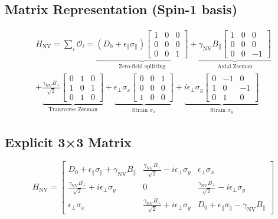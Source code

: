 \subsection*{Matrix Representation (Spin-1 basis)}
\begin{multline*}
H_{\text{NV}} = \sum_{i} \mathcal{O}_i =
\underbrace{(D_0 + \epsilon_{\parallel}\sigma_{\parallel})
\begin{bmatrix}
1 & 0 & 0 \\
0 & 0 & 0 \\
0 & 0 & 1
\end{bmatrix}}_{\text{Zero-field splitting}}
+
\underbrace{\gamma_{\text{NV}} B_{\parallel}
\begin{bmatrix}
1 & 0 & 0 \\
0 & 0 & 0 \\
0 & 0 & -1
\end{bmatrix}}_{\text{Axial Zeeman}} \\
+
\underbrace{\frac{\gamma_{\text{NV}} B_{\perp}}{\sqrt{2}}
\begin{bmatrix}
0 & 1 & 0 \\
1 & 0 & 1 \\
0 & 1 & 0
\end{bmatrix}}_{\text{Transverse Zeeman}}
+
\underbrace{\epsilon_{\perp}\sigma_x
\begin{bmatrix}
0 & 0 & 1 \\
0 & 0 & 0 \\
1 & 0 & 0
\end{bmatrix}}_{\text{Strain } \sigma_x}
+
\underbrace{i\epsilon_{\perp}\sigma_y
\begin{bmatrix}
0 & -1 & 0 \\
1 & 0 & -1 \\
0 & 1 & 0
\end{bmatrix}}_{\text{Strain } \sigma_y}
\end{multline*}
\subsection*{Explicit 3×3 Matrix}


\begin{equation}
H_{\text{NV}} = 
\begin{bmatrix}
D_0 + \epsilon_{\parallel}\sigma_{\parallel} + \gamma_{\text{NV}}B_{\parallel} 
& \frac{\gamma_{\text{NV}} B_{\perp}}{\sqrt{2}} - i\epsilon_{\perp}\sigma_y 
& \epsilon_{\perp}\sigma_x \\
\frac{\gamma_{\text{NV}} B_{\perp}}{\sqrt{2}} + i\epsilon_{\perp}\sigma_y 
& 0 
& \frac{\gamma_{\text{NV}} B_{\perp}}{\sqrt{2}} - i\epsilon_{\perp}\sigma_y \\
\epsilon_{\perp}\sigma_x 
& \frac{\gamma_{\text{NV}} B_{\perp}}{\sqrt{2}} + i\epsilon_{\perp}\sigma_y 
& D_0 + \epsilon_{\parallel}\sigma_{\parallel} - \gamma_{\text{NV}}B_{\parallel}
\end{bmatrix}
\end{equation}
